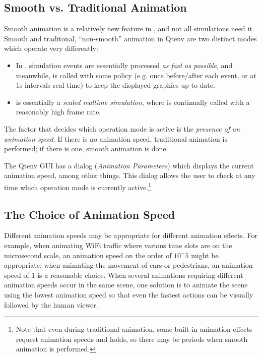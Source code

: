 \subsection{Smooth vs. Traditional Animation}
\label{sec:graphics:animation-modes}

Smooth animation is a relatively new feature in \opp, and not all simulations
need it. Smooth and traditonal, ``non-smooth'' animation in Qtenv are
two distinct modes which operate very differently:

\begin{itemize}
  \item In , simulation events are essentially
    processed \textit{as fast as possible}, and meanwhile, 
    is called with some policy (e.g. once before/after each event, or at
    1s intervals real-time) to keep the displayed  graphics up to date.
  \item {} is essentially a \textit{scaled realtime simulation},
    where  is continually called with a reasonably
    high frame rate.
\end{itemize}

The factor that decides which operation mode is active is the \textit{presence
of an animation speed}. If there is no animation speed, traditional
animation is performed; if there is one, smooth animation is done.

The Qtenv GUI has a dialog (\textit{Animation Parameters}) which displays
the current animation speed, among other things. This dialog allows the
user to check at any time which operation mode is currently active.\footnote{
Note that even during traditional animation, some built-in animation effects
request animation speeds and holds, so there may be periods when smooth animation
is performed.}

\subsection{The Choice of Animation Speed}
\label{sec:graphics:animation-speed}

Different animation speeds may be appropriate for different animation effects.
For example, when animating WiFi traffic where various time slots are on the microsecond scale,
an animation speed on the order of $10^-5$ might be appropriate; when animating the
movement of cars or pedestrians, an animation speed of $1$ is a reasonable choice.
When several animations requiring different animation speeds occur in the same
scene, one solution is to animate the scene using the lowest animation speed
so that even the fastest actions can be visually followed by the human viewer.

